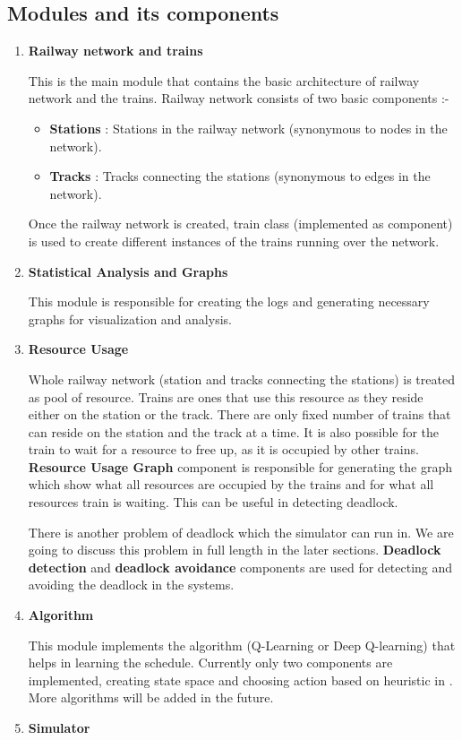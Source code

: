 \subsection{Modules and its components}
\begin{enumerate}
\item \textbf{Railway network and trains}

This is the main module that contains the basic architecture of railway network and the 
trains. Railway network consists of two basic components :-
\begin{itemize}
\item \textbf{Stations} : Stations in the railway network (synonymous to nodes in the network).
\item \textbf{Tracks} : Tracks connecting the stations (synonymous to edges in the network).
\end{itemize}
Once the railway network is created, train class (implemented as component) is used to create different instances
of the trains running over the network.

\item \textbf{Statistical Analysis and Graphs}

This module is responsible for creating the logs and generating necessary graphs for visualization 
and analysis.

\item \textbf{Resource Usage}

Whole railway network (station and tracks connecting the stations) is treated as pool of resource.
 Trains are ones that use this resource as they reside either on the station or the track. 
There are only fixed number of trains that can reside on the station and the track at a time.
It is also possible for the train to wait for a resource to free up, as it is occupied by other
trains. \textbf{Resource Usage Graph} component is responsible for generating the graph which show
what all resources are occupied by the trains and for what all resources train is waiting. This can be useful in detecting
deadlock.


There is another problem of deadlock which the simulator can run in. We are going to discuss this problem 
in full length in the later sections.\textbf{ Deadlock detection} and \textbf{deadlock avoidance} components
are used for detecting and avoiding the deadlock in the systems.

\item \textbf{Algorithm}

This module implements the algorithm (Q-Learning or Deep Q-learning) that helps in learning
the schedule. Currently only two components are implemented, creating state space and 
choosing action based on heuristic in \cite{ARTICLE:2}. More algorithms will be added in the future.
\vspace{2cm}
\item \textbf{Simulator}


\end{enumerate}
